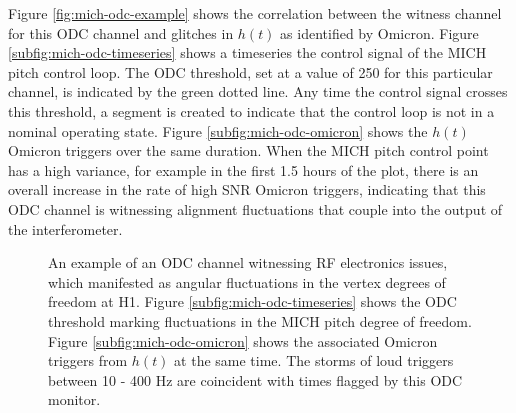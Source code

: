 Figure \ref{fig:mich-odc-example} 
shows the correlation between the witness channel for this ODC channel 
and glitches in $h(t)$ as identified by Omicron. Figure \ref{subfig:mich-odc-timeseries} 
shows a timeseries the control signal of the MICH pitch control loop. The ODC threshold, 
set at a value of 250 for this particular channel, is indicated by the green dotted 
line. Any time the control signal crosses this threshold, a segment is created to 
indicate that the control loop is not in a nominal operating state. Figure 
\ref{subfig:mich-odc-omicron} shows the $h(t)$ Omicron triggers over the same 
duration. When the MICH pitch control point has a high variance, for example 
in the first 1.5 hours of the plot, there is an 
overall increase in the rate of high SNR Omicron triggers, indicating that 
this ODC channel is witnessing alignment fluctuations that couple into the 
output of the interferometer. 

\begin{figure}[ht!]%

\caption[ODC threshold on MICH pitch]{%
         An example of an ODC channel witnessing RF electronics issues, which %
         manifested as angular fluctuations in the vertex degrees of freedom %
         at H1. Figure \ref{subfig:mich-odc-timeseries} shows the ODC threshold %
         marking fluctuations in the MICH pitch degree of freedom. Figure %
         \ref{subfig:mich-odc-omicron} shows the associated Omicron triggers from %
         $h(t)$ at the same time. The storms of loud triggers between 10 - 400 Hz %
         are coincident with times flagged by this ODC monitor.}
\end{figure}\label{fig:mich-odc-example}

